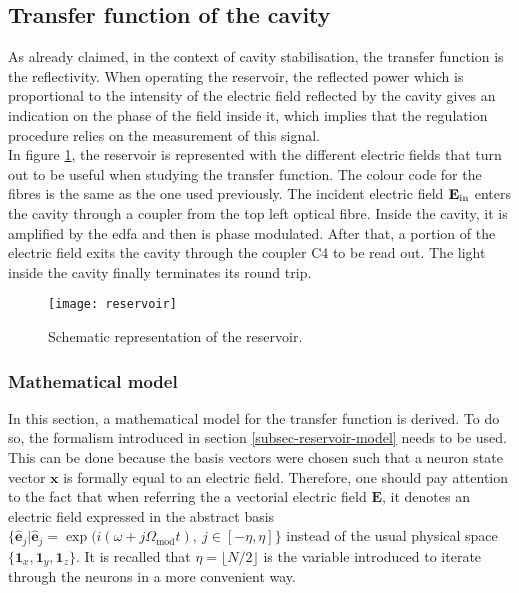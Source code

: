 \subsection{Transfer function of the cavity}

As already claimed, in the context of cavity stabilisation, the transfer function is the reflectivity. When operating the reservoir, the reflected power which is proportional to the intensity of the electric field reflected by the cavity gives an indication on the phase of the field inside it, which implies that the regulation procedure relies on the measurement of this signal. \\

In figure \ref{schematic_reservoir}, the reservoir is represented with the different electric fields that turn out to be useful when studying the transfer function. The colour code for the fibres is the same as the one used previously. The incident electric field $\mathbf{E}_{\text{in}}$ enters the cavity through a coupler from the top left optical fibre. Inside the cavity, it is amplified by the \gls{edfa} and then is phase modulated. After that, a portion of the electric field exits the cavity through the coupler C4 to be read out. The light inside the cavity finally terminates its round trip.

\begin{figure}[h]
	\centering
	\texttt{[image: reservoir]}
	\caption{Schematic representation of the reservoir.}
	\label{schematic_reservoir}
\end{figure}


\subsubsection{Mathematical model}

\label{subsubsec-tf-cavity}

In this section, a mathematical model for the transfer function is derived. To do so, the formalism introduced in section \ref{subsec-reservoir-model} needs to be used. This can be done because the basis vectors were chosen such that a neuron state vector $\mathbf{x}$ is formally equal to an electric field. Therefore, one should pay attention to the fact that when referring the a vectorial electric field $\mathbf{E}$, it denotes an electric field expressed in the abstract basis $\{ \hat{\mathbf{e}}_j | \hat{\mathbf{e}}_j = \exp{ (i (\omega+j\Omega_{\text{mod}}t)}, ~j\in [-\eta, \eta ] \}$ instead of the usual physical space $\{\mathbf{1}_x, \mathbf{1}_y,\mathbf{1}_z \}$. It is recalled that $\eta = \lfloor N/2 \rfloor$ is the variable introduced to iterate through the neurons in a more convenient way.\\

